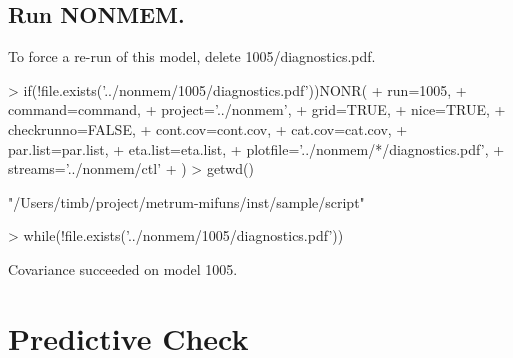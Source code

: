 \subsection{Run NONMEM.}
To force a re-run of this model, delete 1005/diagnostics.pdf.
\begin{Schunk}
\begin{Sinput}
> if(!file.exists('../nonmem/1005/diagnostics.pdf'))NONR(
+      run=1005,
+      command=command,
+      project='../nonmem',
+      grid=TRUE,
+      nice=TRUE,
+      checkrunno=FALSE,
+      cont.cov=cont.cov,
+      cat.cov=cat.cov,
+      par.list=par.list,
+      eta.list=eta.list,
+      plotfile='../nonmem/*/diagnostics.pdf',
+      streams='../nonmem/ctl'
+ )
> getwd()
\end{Sinput}
\begin{Soutput}
[1] "/Users/timb/project/metrum-mifuns/inst/sample/script"
\end{Soutput}
\begin{Sinput}
> while(!file.exists('../nonmem/1005/diagnostics.pdf')){}
\end{Sinput}
\end{Schunk}
Covariance succeeded on model 1005.
\section{Predictive Check}
